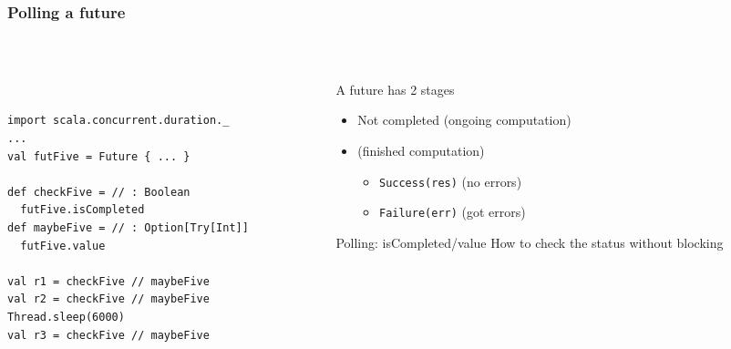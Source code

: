 \documentclass[aspectratio=169]{beamer}
\begin{document}
\begin{frame}[fragile]\frametitle{Polling a future}
~\\[-8mm]
\begin{columns}
\begin{column}{0.56\textwidth}
~\\
\begin{lstlisting}[emph={execute,sleep,log,Future,Try,Success,Failure,onComplete,Await,result,ready}]
import scala.concurrent.duration._
...
val futFive = Future { ... }

def checkFive = // : Boolean
  futFive.isCompleted
def maybeFive = // : Option[Try[Int]]
  futFive.value

val r1 = checkFive // maybeFive
val r2 = checkFive // maybeFive
Thread.sleep(6000)
val r3 = checkFive // maybeFive
\end{lstlisting}
\end{column}
\begin{column}{0.46\textwidth}
\begin{block}{A future has 2 stages}
\begin{itemize}
  \item \alert{Not completed} (ongoing computation)
  \item {} (finished computation)
  \begin{itemize}
    \item \texttt{Success(res)} (no errors)
    \item \texttt{Failure(err)} (got errors)
  \end{itemize}
\end{itemize}
\end{block}
\begin{alertblock}{Polling: isCompleted/value}
How to check the status without blocking
\end{alertblock}

\end{column}
\end{columns}
\end{frame}
\end{document}
